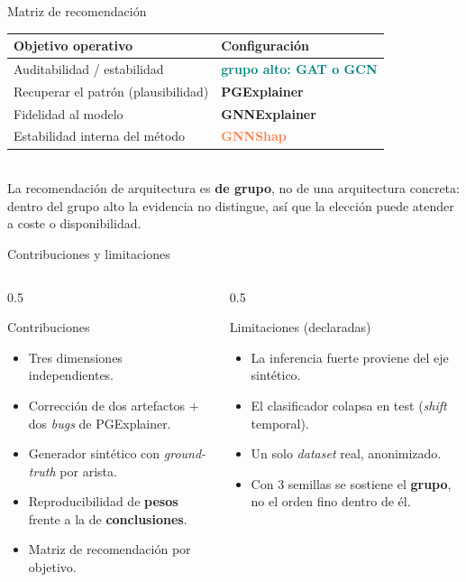 \documentclass[aspectratio=169,11pt]{beamer}
\begin{document}
\begin{frame}{Matriz de recomendación}
\begin{center}
\renewcommand{\arraystretch}{1.5}
\begin{tabular}{ll}
\toprule
\textbf{Objetivo operativo} & \textbf{Configuración} \\
\midrule
Auditabilidad / estabilidad & \textcolor{teal}{\textbf{grupo alto: GAT o GCN}} \\
Recuperar el patrón (plausibilidad) & \textcolor{seafoam}{\textbf{PGExplainer}} \\
Fidelidad al modelo & \textcolor{amber}{\textbf{GNNExplainer}} \\
Estabilidad interna del método & \textcolor{coral}{\textbf{GNNShap}} \\
\bottomrule
\end{tabular}
\\[8pt]
{\footnotesize\color{muted} La recomendación de arquitectura es \textbf{de grupo}, no de una arquitectura concreta:\\dentro del grupo alto la evidencia no distingue, así que la elección puede atender a coste o disponibilidad.}
\end{center}
\end{frame}

\begin{frame}{Contribuciones y limitaciones}
\begin{columns}[T]
\begin{column}{0.5\textwidth}
\begin{block}{Contribuciones}
\begin{itemize}\small
  \item Tres dimensiones independientes.
  \item Corrección de dos artefactos + dos \textit{bugs} de PGExplainer.
  \item Generador sintético con \textit{ground-truth} por arista.
  \item Reproducibilidad de \textbf{pesos} frente a la de \textbf{conclusiones}.
  \item Matriz de recomendación por objetivo.
\end{itemize}
\end{block}
\end{column}
\begin{column}{0.5\textwidth}
\begin{alertblock}{Limitaciones (declaradas)}
\begin{itemize}\small
  \item La inferencia fuerte proviene del eje sintético.
  \item El clasificador colapsa en test (\textit{shift} temporal).
  \item Un solo \textit{dataset} real, anonimizado.
  \item Con 3 semillas se sostiene el \textbf{grupo}, no el orden fino dentro de él.
\end{itemize}
\end{alertblock}
\end{column}
\end{columns}
\end{frame}
\end{document}
